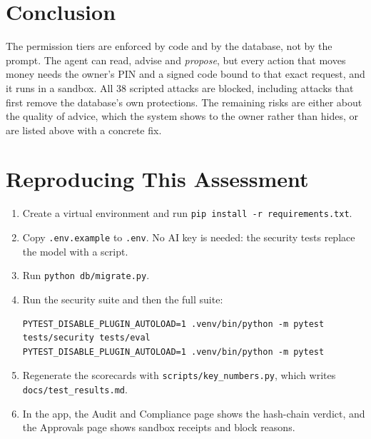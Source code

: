 \documentclass[10pt,a4paper]{article}
\newcommand{\code}[1]{\texttt{\small #1}}
\begin{document}
\section{Conclusion}

The permission tiers are enforced by code and by the database, not by the prompt. The agent can read, advise and \emph{propose}, but every action that moves money needs the owner's PIN and a signed code bound to that exact request, and it runs in a sandbox. All 38 scripted attacks are blocked, including attacks that first remove the database's own protections. The remaining risks are either about the quality of advice, which the system shows to the owner rather than hides, or are listed above with a concrete fix.

\appendix
\section{Reproducing This Assessment}
\begin{enumerate}
  \item Create a virtual environment and run \code{pip install -r requirements.txt}.
  \item Copy \code{.env.example} to \code{.env}. No AI key is needed: the security tests replace the model with a script.
  \item Run \code{python db/migrate.py}.
  \item Run the security suite and then the full suite:
\begin{lstlisting}
PYTEST_DISABLE_PLUGIN_AUTOLOAD=1 .venv/bin/python -m pytest tests/security tests/eval
PYTEST_DISABLE_PLUGIN_AUTOLOAD=1 .venv/bin/python -m pytest
\end{lstlisting}
  \item Regenerate the scorecards with \code{scripts/key\_numbers.py}, which writes \code{docs/test\_results.md}.
  \item In the app, the Audit and Compliance page shows the hash-chain verdict, and the Approvals page shows sandbox receipts and block reasons.
\end{enumerate}
\end{document}
